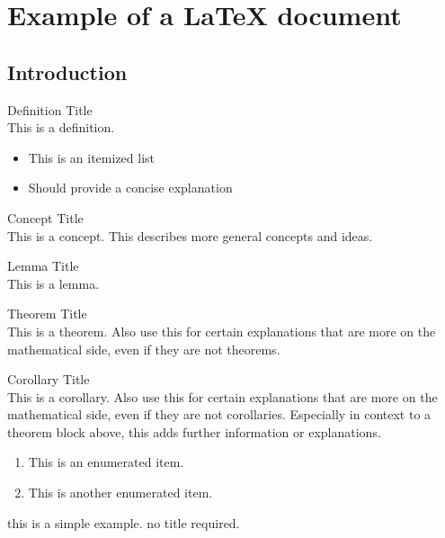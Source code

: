 \section{Example of a LaTeX document}

\subsection{Introduction}

\begin{definition}{Definition Title}\\
    This is a definition.
    \begin{itemize}
        \item This is an itemized list
        \item Should provide a concise explanation
    \end{itemize}
\end{definition}

\begin{concept}{Concept Title}\\
    This is a concept. This describes more general concepts and ideas.
\end{concept}

\begin{lemma}{Lemma Title}\\
    This is a lemma.
\end{lemma}

\begin{theorem}{Theorem Title}\\
    This is a theorem. Also use this for certain explanations that are more on the mathematical side, even if they are not theorems.
\end{theorem}

\begin{corollary}{Corollary Title}\\
    This is a corollary. Also use this for certain explanations that are more on the mathematical side, even if they are not corollaries. 
    Especially in context to a theorem block above, this adds further information or explanations.
    \begin{enumerate}
        \item This is an enumerated item.
        \item This is another enumerated item.
    \end{enumerate}
\end{corollary}

\begin{example}
    this is a simple example. no title required.
\end{example}

